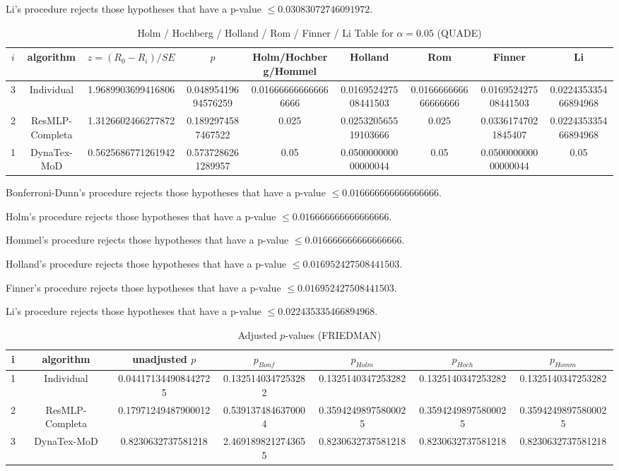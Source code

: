 \documentclass[a4paper,10pt]{article}
\begin{document}
\begin{landscape}
Li's procedure rejects those hypotheses that have a p-value $\le0.03083072746091972$.



\newpage

\begin{table}[!htp]
\centering\scriptsize
\caption{Holm / Hochberg / Holland / Rom / Finner / Li Table for $\alpha=0.05$ (QUADE)}
\begin{tabular}{ccccccccc}
$i$&algorithm&$z=(R_0 - R_i)/SE$&$p$&Holm/Hochberg/Hommel&Holland&Rom&Finner&Li\\
\hline
3&Individual&1.9689903699416806&0.04895419694576259&0.016666666666666666&0.016952427508441503&0.016666666666666666&0.016952427508441503&0.022435335466894968\\
2&ResMLP-Completa&1.3126602466277872&0.1892974587467522&0.025&0.025320565519103666&0.025&0.03361747021845407&0.022435335466894968\\
1&DynaTex-MoD&0.5625686771261942&0.5737286261289957&0.05&0.050000000000000044&0.05&0.050000000000000044&0.05\\
\hline
\end{tabular}
\end{table}
Bonferroni-Dunn's procedure rejects those hypotheses that have a p-value $\le0.016666666666666666$.


Holm's procedure rejects those hypotheses that have a p-value $\le0.016666666666666666$.


Hommel's procedure rejects those hypotheses that have a p-value $\le0.016666666666666666$.


Holland's procedure rejects those hypotheses that have a p-value $\le0.016952427508441503$.


Finner's procedure rejects those hypotheses that have a p-value $\le0.016952427508441503$.


Li's procedure rejects those hypotheses that have a p-value $\le0.022435335466894968$.



\newpage

\begin{table}[!htp]
\centering\scriptsize
\caption{Adjusted $p$-values (FRIEDMAN)}
\begin{tabular}{ccccccc}
i&algorithm&unadjusted $p$&$p_{Bonf}$&$p_{Holm}$&$p_{Hoch}$&$p_{Homm}$\\
\hline
1&Individual&0.044171344908442725&0.1325140347253282&0.1325140347253282&0.1325140347253282&0.1325140347253282\\
2&ResMLP-Completa&0.17971249487900012&0.5391374846370004&0.35942498975800025&0.35942498975800025&0.35942498975800025\\
3&DynaTex-MoD&0.8230632737581218&2.4691898212743655&0.8230632737581218&0.8230632737581218&0.8230632737581218\\
\hline
\end{tabular}
\end{table}


\end{landscape}
\end{document}
